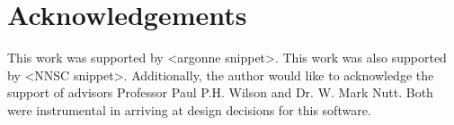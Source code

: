 \section{Acknowledgements}
This work was supported by <argonne snippet>. This work was also supported by 
<NNSC snippet>.
Additionally, the author would like to acknowledge the support of advisors 
Professor Paul P.H. Wilson and Dr. W. Mark Nutt. Both were instrumental in 
arriving at design decisions for this software.
